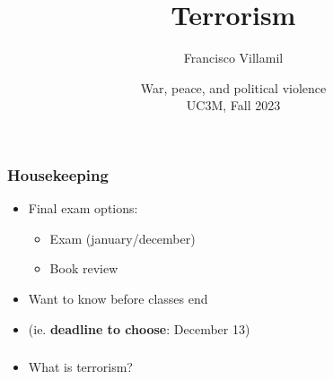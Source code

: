 \documentclass[aspectratio=43]{beamer}
\title{\huge Terrorism}
\author{Francisco Villamil}
\date{War, peace, and political violence\\UC3M, Fall 2023}
\begin{document}
\begin{frame}
  \titlepage
\end{frame}

\begin{frame}
\frametitle{Housekeeping}
\centering

\begin{itemize}
  \item Final exam options:
  \begin{itemize}
    \item Exam (january/december)
    \item Book review
  \end{itemize}
  \item Want to know before classes end
  \item[] (ie. \textbf{deadline to choose}: December 13)
\end{itemize}

\end{frame}
  
\begin{frame}
\frametitle{}
\centering

\begin{itemize}
  \item What is terrorism?
\end{itemize}

\end{frame}


\end{document}
